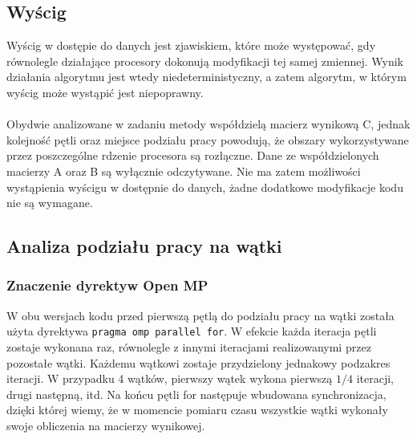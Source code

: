 \documentclass[12pt,a4paper]{article}
\begin{document}

\subsection{Wyścig}

Wyścig w dostępie do danych jest zjawiskiem, które może występować, gdy równolegle działające procesory dokonują modyfikacji tej samej zmiennej. Wynik działania algorytmu jest wtedy niedeterministyczny, a zatem algorytm, w którym wyścig może wystąpić jest niepoprawny.\\
\\
Obydwie analizowane w zadaniu metody współdzielą macierz wynikową C, jednak kolejność pętli oraz miejsce podziału pracy powodują, że obszary wykorzystywane przez poszczególne rdzenie procesora są rozłączne. Dane ze współdzielonych macierzy A oraz B są wyłącznie odczytywane. Nie ma zatem możliwości wystąpienia wyścigu w dostępnie do danych, żadne dodatkowe modyfikacje kodu nie są wymagane.

\subsection{Analiza podziału pracy na wątki}

\subsubsection{Znaczenie dyrektyw Open MP}

W obu wersjach kodu przed pierwszą pętlą do podziału pracy na wątki została użyta dyrektywa
\texttt{pragma omp parallel for}. W efekcie każda iteracja pętli zostaje wykonana raz,
równolegle z innymi iteracjami realizowanymi przez pozostałe wątki. Każdemu wątkowi zostaje
przydzielony jednakowy podzakres iteracji. W przypadku 4 wątków, pierwszy wątek wykona pierwszą
$1/4$ iteracji, drugi następną, itd. Na końcu pętli for następuje wbudowana synchronizacja,
dzięki której wiemy, że w momencie pomiaru czasu wszystkie wątki wykonały swoje obliczenia na macierzy wynikowej.
\end{document}
